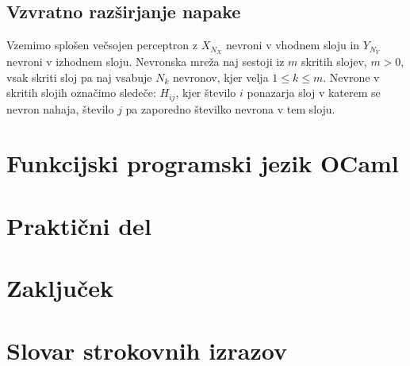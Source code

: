 \documentclass[mat1]{fmfdelo}
\begin{document}
\subsection{Vzvratno razširjanje napake}
Vzemimo splošen večsojen perceptron z $X_{N_X}$ nevroni v vhodnem sloju in $Y_{N_Y}$ nevroni v izhodnem sloju. Nevronska mreža naj sestoji iz $m$ skritih slojev, $m>0$, vsak skriti sloj pa naj vsabuje $N_k$ nevronov, kjer velja $1\leq k \leq m$. Nevrone v skritih slojih označimo sledeče: $H_{ij}$, kjer število $i$ ponazarja sloj v katerem se nevron nahaja, število $j$ pa zaporedno številko nevrona v tem sloju. 

\section{Funkcijski programski jezik OCaml}

\section{Praktični del}

\section{Zaključek}

\section*{Slovar strokovnih izrazov}

\geslo{}{}
\geslo{}{}

\begin{thebibliography}{99}



\end{thebibliography}
\end{document}
